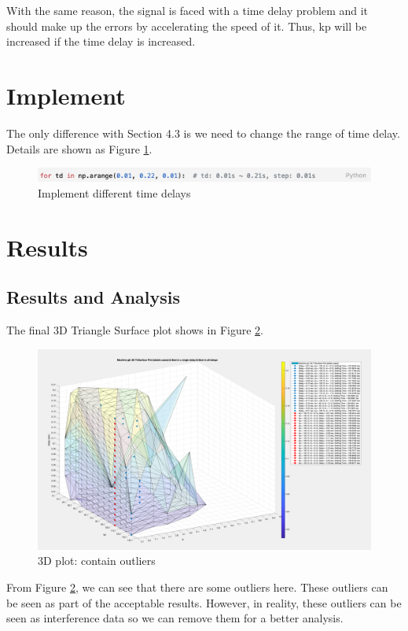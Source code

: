 \documentclass{report}
\begin{document}
With the same reason, the signal is faced with a time delay problem and it should make up the errors by accelerating the speed of it. Thus, kp will be increased if the time delay is increased. \\

\section{Implement} %
The only difference with Section 4.3 is we need to change the range of time delay. Details are shown as Figure \textcolor{red}{\ref{5_3_code}}. \\

\begin{figure}[htbp]
\centering
\includegraphics[width = .999\textwidth]{figure/5_3_code.png}
\caption{Implement different time delays}
\label{5_3_code}
\end{figure}


\section{Results} %
\subsection{Results and Analysis} %
The final 3D Triangle Surface plot shows in Figure \textcolor{red}{\ref{5_4_1_Outlier}}.\\

\begin{figure}[htbp]
\centering
\includegraphics[width = .819\textwidth]{figure/5_4_1_Outlier.png}
\caption{3D plot: contain outliers}
\label{5_4_1_Outlier}
\end{figure}

From Figure \textcolor{red}{\ref{5_4_1_Outlier}}, we can see that there are some outliers here. These outliers can be seen as part of the acceptable results. However, in reality, these outliers can be seen as interference data so we can remove them for a better analysis.\\
\end{document}
